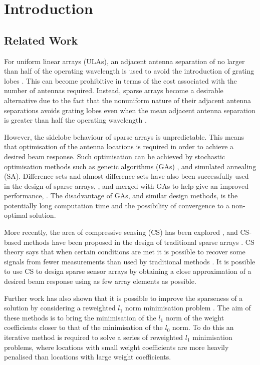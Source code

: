 \documentclass[10pt,final]{IEEEtran}
\begin{document}
\section{Introduction}
\subsection{Related Work}
For uniform linear arrays (ULAs), an adjacent antenna separation of no larger than half of the
operating wavelength is used to avoid the introduction of grating lobes \cite{vantrees02a,liu2010}.
 This can become prohibitive in terms of the cost associated with the number of antennas required.
  Instead, sparse arrays become a desirable alternative due to the fact that the nonuniform nature of their
  adjacent antenna separations avoids grating lobes even when the mean adjacent antenna separation is greater
  than half the operating wavelength \cite{Jarske88}.

However, the sidelobe behaviour of sparse arrays is unpredictable.  This means that optimisation of the
antenna locations is required in order to achieve a desired beam response.  Such optimisation can be achieved by stochastic optimisation methods such as
genetic algorithms (GAs)
\cite{Haupt94,Yan97a,Hawes12}, and simulated
annealing (SA)\cite{Trucco99a,Repetto06}.  Difference sets and almost difference
sets have also been successfully used in the design of sparse
arrays, \cite{Oliveri09,Oliveri10}, and merged with GAs to help give
an improved performance, \cite{Caorsi04,Oliveri11}.  The
disadvantage of GAs, and similar design methods,  is the potentially
long computation time and the possibility of convergence to a
non-optimal solution.

More recently, the area of compressive sensing (CS) has been
explored \cite{Candes06}, and CS-based methods have been proposed in
the design of traditional sparse arrays
\cite{Prisco11,Carin09,Cen10b,Hawes14c,Hawes14b,Hawes15b}. CS theory says that when certain conditions are met it is possible to recover
some signals from fewer measurements than used by traditional
methods \cite{Candes06}. It is possible to use CS to design sparse sensor arrays by obtaining a close approximation of a desired beam response using as few array elements as possible.

Further work has also shown that it is possible to improve the
sparseness of a solution by considering a reweighted $l_{1}$ norm
minimisation problem \cite{Hawes14c,Candes08,Fuchs12,Prisco12}.  The aim of
these methods is to bring the minimisation of the $l_{1}$ norm of
the weight coefficients closer to that of the minimisation of the
$l_{0}$ norm.  To do this an iterative method is required to solve a
series of reweighted $l_{1}$ minimisation problems, where locations
with small weight coefficients are more heavily penalised than
locations with large weight coefficients.
\end{document}
